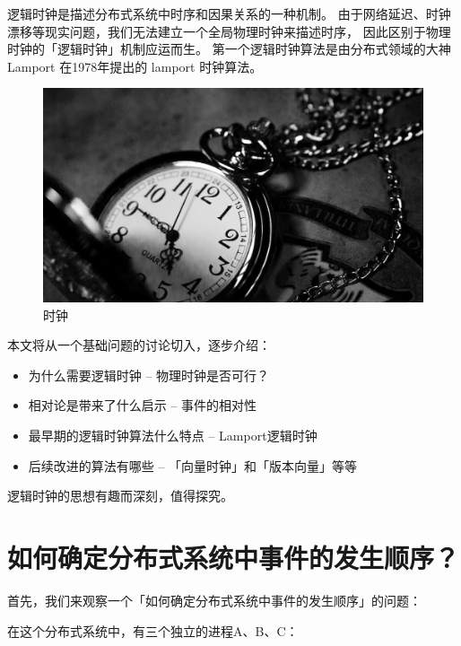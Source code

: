\documentclass[cn,11pt,chinese]{elegantbook}
\providecommand{\tightlist}{%
  \setlength{\itemsep}{0pt}\setlength{\parskip}{0pt}}
\begin{document}
逻辑时钟是描述分布式系统中时序和因果关系的一种机制。
由于网络延迟、时钟漂移等现实问题，我们无法建立一个全局物理时钟来描述时序，
因此区别于物理时钟的「逻辑时钟」机制应运而生。
第一个逻辑时钟算法是由分布式领域的大神 Lamport 在1978年提出的 lamport
时钟算法。

\begin{figure}
\centering
\includegraphics{images/repr-clock.jpeg}
\caption{时钟}
\end{figure}

本文将从一个基础问题的讨论切入，逐步介绍：

\begin{itemize}
\tightlist
\item
  为什么需要逻辑时钟 -- 物理时钟是否可行？
\item
  相对论是带来了什么启示 -- 事件的相对性
\item
  最早期的逻辑时钟算法什么特点 -- Lamport逻辑时钟
\item
  后续改进的算法有哪些 -- 「向量时钟」和「版本向量」等等
\end{itemize}

逻辑时钟的思想有趣而深刻，值得探究。

\hypertarget{ux5982ux4f55ux786eux5b9aux5206ux5e03ux5f0fux7cfbux7edfux4e2dux4e8bux4ef6ux7684ux53d1ux751fux987aux5e8f}{%
\section{如何确定分布式系统中事件的发生顺序？}\label{ux5982ux4f55ux786eux5b9aux5206ux5e03ux5f0fux7cfbux7edfux4e2dux4e8bux4ef6ux7684ux53d1ux751fux987aux5e8f}}

首先，我们来观察一个「如何确定分布式系统中事件的发生顺序」的问题：

在这个分布式系统中，有三个独立的进程A、B、C：
\end{document}
